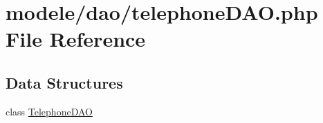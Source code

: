 \hypertarget{telephone_d_a_o_8php}{}\section{modele/dao/telephone\+D\+AO.php File Reference}
\label{telephone_d_a_o_8php}
\subsection*{Data Structures}
\begin{DoxyCompactItemize}
\item 
class \hyperlink{class_telephone_d_a_o}{Telephone\+D\+AO}
\end{DoxyCompactItemize}
